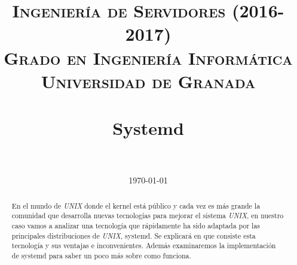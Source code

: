 


\title{	
\normalfont \normalsize 
\textsc{\textbf{Ingeniería de Servidores (2016-2017)} \\ Grado en Ingeniería Informática \\ Universidad de Granada} \\ [25pt] %
\horrule{0.5pt} \\[0.4cm] %
\huge Systemd \\ %
\horrule{2pt} \\[0.5cm] %
}

\date{\normalsize\today} %




\maketitle %

\newpage

\begin{abstract}

En el mundo de \textit{UNIX} donde el kernel está público y 
cada vez es más grande la comunidad que desarrolla nuevas tecnologías 
para mejorar el sistema \textit{UNIX}, en nuestro caso vamos a analizar
una tecnología que rápidamente ha sido adaptada por las principales 
distribuciones de \textit{UNIX}, systemd. Se explicará en que consiste esta 
tecnología y sus ventajas e inconvenientes. Además examinaremos la
 implementación de systemd para saber un poco más sobre como funciona.

\end{abstract}


